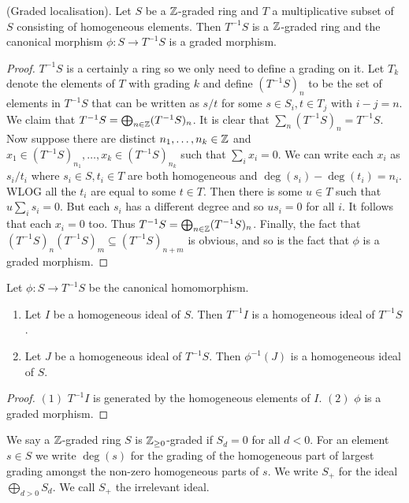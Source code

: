 \documentclass{memoir}
\begin{document}
\begin{thm}
    (Graded localisation).
    Let $S$ be a $\mathbb{Z}$-graded ring and $T$ a multiplicative subset of $S$ consisting of homogeneous elements.
    Then $T^{-1}S$ is a $\mathbb{Z}$-graded ring and the canonical morphism $\phi:S\to T^{-1}S$ is a graded morphism.
\end{thm}
\begin{proof}
    $T^{-1}S$ is a certainly a ring so we only need to define a grading on it.
    Let $T_k$ denote the elements of $T$ with grading $k$ and define $(T^{-1}S)_n$ to be the set of elements in $T^{-1}S$ that can be written as $s/t$ for some $s\in S_i, t\in T_j$ with $i-j = n$.
    We claim that $T^{-1}S = \bigoplus_{n\in\mathbb{Z}}(T^{-1}S)_n$.
    It is clear that $\sum_n(T^{-1}S)_n = T^{-1}S$.
    Now suppose there are distinct $n_1,\dots,n_k\in\mathbb{Z}$ and $x_1\in(T^{-1}S)_{n_1},\dots,x_k\in(T^{-1}S)_{n_k}$ such that $\sum_ix_i = 0$.
    We can write each $x_i$ as $s_i/t_i$ where $s_i\in S, t_i\in T$ are both homogeneous and $\deg(s_i)-\deg(t_i)=n_i$.
    WLOG all the $t_i$ are equal to some $t\in T$.
    Then there is some $u\in T$ such that $u\sum_is_i = 0$.
    But each $s_i$ has a different degree and so $us_i = 0$ for all $i$.
    It follows that each $x_i = 0$ too.
    Thus $T^{-1}S = \bigoplus_{n\in\mathbb{Z}}(T^{-1}S)_n$.
    Finally, the fact that $(T^{-1}S)_n(T^{-1}S)_m\subseteq(T^{-1}S)_{n+m}$ is obvious, and so is the fact that $\phi$ is a graded morphism.
\end{proof}
\begin{proposition}
    Let $\phi:S\to T^{-1}S$ be the canonical homomorphism.
    \begin{enumerate}
        \item Let $I$ be a homogeneous ideal of $S$.
            Then $T^{-1}I$ is a homogeneous ideal of $T^{-1}S$.
        \item Let $J$ be a homogeneous ideal of $T^{-1}S$.
            Then $\phi^{-1}(J)$ is a homogeneous ideal of $S$.
    \end{enumerate}
\end{proposition}
\begin{proof}
    $(1)$ $T^{-1}I$ is generated by the homogeneous elements of $I$.
    $(2)$ $\phi$ is a graded morphism.
\end{proof}
\begin{definition}
    We say a $\mathbb{Z}$-graded ring $S$ is $\mathbb{Z}_{\ge0}$-graded if $S_d = 0$ for all $d<0$.
    For an element $s\in S$ we write $\deg(s)$ for the grading of the homogeneous part of largest grading amongst the non-zero homogeneous parts of $s$.
    We write $S_+$ for the ideal $\bigoplus_{d>0}S_d$.
    We call $S_+$ the irrelevant ideal.
\end{definition}
\end{document}
